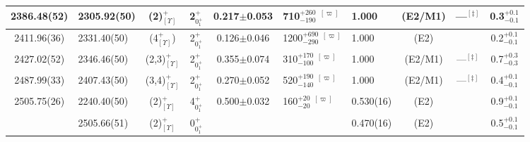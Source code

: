 \begin{landscape}
\begin{center}
\begin{longtable}{clcccllccc}
% 
% 
 2386.48(52)& 2305.92(50) & (2)$^+_{[\Upsilon]}$     & 2$^+_{0^+_1}$ &0.217$\pm$0.053& 710$^{+260}_{-190}$     $^{[\varpi]}$               &1.000                &(E2/M1)& ---$^{[\ddagger]}$                       & 0.3$^{+0.1}_{-0.1}$   \\ \hline
 2411.96(36)& 2331.40(50) & (4$^+_{[\Upsilon]}$)     & 2$^+_{0^+_1}$ &0.126$\pm$0.046& 1200$^{+690}_{-290}$    $^{[\varpi]}$               &1.000                & (E2)  &                                          & 0.2$^{+0.1}_{-0.1}$  \\ \hline 
 2427.02(52)& 2346.46(50) & (2,3)$^+_{[\Upsilon]}$   & 2$^+_{0^+_1}$ &0.355$\pm$0.074& 310$^{+170}_{-100}$     $^{[\varpi]}$               &1.000                &(E2/M1)& ---$^{[\ddagger]}$                       & 0.7$^{+0.3}_{-0.3}$   \\ \hline
 2487.99(33)& 2407.43(50) & (3,4)$^+_{[\Upsilon]}$   & 2$^+_{0^+_1}$ &0.270$\pm$0.052& 520$^{+190}_{-140}$     $^{[\varpi]}$               &1.000                &(E2/M1)& ---$^{[\ddagger]}$                       & 0.4$^{+0.1}_{-0.1}$   \\ \hline
 2505.75(26)& 2240.40(50) & (2)$^+_{[\Upsilon]}$     & 4$^+_{0^+_1}$ &0.500$\pm$0.032& 160$^{+20}_{-20}$       $^{[\varpi]}$               &0.530(16)            & (E2)  &                                          & 0.9$^{+0.1}_{-0.1}$\\
            & 2505.66(51) & (2)$^+_{[\Upsilon]}$     & 0$^+_{0^+_1}$ &&                                                                     &0.470(16)            & (E2)  &                                          & 0.5$^{+0.1}_{-0.1}$ \\ \hline

\end{longtable}
\end{center}
\end{landscape}
